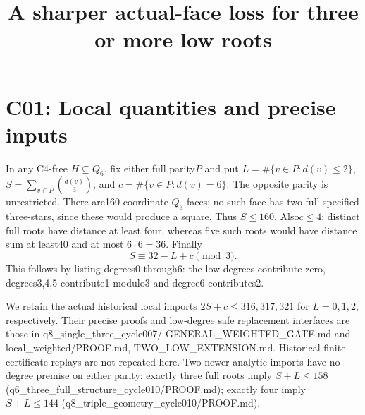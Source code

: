 \documentclass{article}
\begin{document}
\title{A sharper actual-face loss for three or more low roots}
\maketitle
\section{C01: Local quantities and precise inputs}
In any C4-free $H\subseteq Q_6$, fix either full parity$P$ and put
$L=\#\{v\in P:d(v)\le2\}$,
$S=\sum_{v\in P}\binom{d(v)}3$, and
$c=\#\{v\in P:d(v)=6\}$. The opposite parity is unrestricted.
There are160 coordinate $Q_3$ faces; no such face has two full
specified three-stars, since these would produce a square. Thus
$S\le160$. Also$c\le4$: distinct full roots have distance at least
four, whereas five such roots would have distance sum at least40
and at most $6\cdot6=36$. Finally
\[
                 S\equiv32-L+c\pmod3.                  \tag{1}
\]
This follows by listing degrees0 through6: the low degrees contribute
zero, degrees3,4,5 contribute1 modulo3 and degree6 contributes2.

We retain the actual historical local imports $2S+c\le316,317,321$
for $L=0,1,2$, respectively. Their precise proofs and low-degree safe
replacement interfaces are those in q8\_single\_three\_cycle007/
GENERAL\_WEIGHTED\_GATE.md and local\_weighted/PROOF.md,
TWO\_LOW\_EXTENSION.md. Historical finite certificate replays are not
repeated here. Two newer analytic imports have no degree premise on
either parity: exactly three full roots imply $S+L\le158$
(q6\_three\_full\_structure\_cycle010/PROOF.md); exactly four imply
$S+L\le144$ (q8\_triple\_geometry\_cycle010/PROOF.md).
\end{document}

